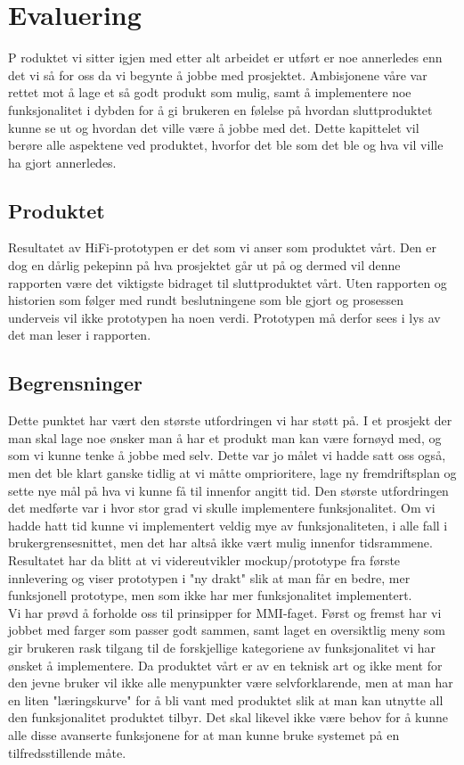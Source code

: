\chapter{Evaluering}
\lettrine[lines=2]{P}{} roduktet vi sitter igjen med etter alt arbeidet er utført er noe annerledes enn det vi så for oss da vi begynte å jobbe med prosjektet. Ambisjonene våre var rettet mot å lage et så godt produkt som mulig, samt å implementere noe funksjonalitet i dybden for å gi brukeren en følelse på hvordan sluttproduktet kunne se ut og hvordan det ville være å jobbe med det. Dette kapittelet vil berøre alle aspektene ved produktet, hvorfor det ble som det ble og hva vil ville ha gjort annerledes.

\section{Produktet}
Resultatet av HiFi-prototypen er det som vi anser som produktet vårt. Den er dog en dårlig pekepinn på hva prosjektet går ut på og dermed vil denne rapporten være det viktigste bidraget til sluttproduktet vårt. Uten rapporten og historien som følger med rundt beslutningene som ble gjort og prosessen underveis vil ikke prototypen ha noen verdi. Prototypen må derfor sees i lys av det man leser i rapporten.


\section{Begrensninger}
Dette punktet har vært den største utfordringen vi har støtt på. I et prosjekt der man skal lage noe ønsker man å har et produkt man kan være fornøyd med, og som vi kunne tenke å jobbe med selv. Dette var jo målet vi hadde satt oss også, men det ble klart ganske tidlig at vi måtte omprioritere, lage ny fremdriftsplan og sette nye mål på hva vi kunne få til innenfor angitt tid.
Den største utfordringen det medførte var i hvor stor grad vi skulle implementere funksjonalitet. Om vi hadde hatt tid kunne vi implementert veldig mye av funksjonaliteten, i alle fall i brukergrensesnittet, men det har altså ikke vært mulig innenfor tidsrammene.
Resultatet har da blitt at vi videreutvikler mockup/prototype fra første innlevering og viser prototypen i "ny drakt" slik at man får en bedre, mer funksjonell prototype, men som ikke har mer funksjonalitet implementert.\\
Vi har prøvd å forholde oss til prinsipper for MMI-faget. Først og fremst har vi jobbet med farger som passer godt sammen, samt laget en oversiktlig meny som gir brukeren rask tilgang til de forskjellige kategoriene av funksjonalitet vi har ønsket å implementere.
Da produktet vårt er av en teknisk art og ikke ment for den jevne bruker vil ikke alle menypunkter være selvforklarende, men at man har en liten "læringskurve" for å bli vant med produktet slik at man kan utnytte all den funksjonalitet produktet tilbyr.
Det skal likevel ikke være behov for å kunne alle disse avanserte funksjonene for at man kunne bruke systemet på en tilfredsstillende måte.


